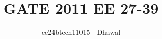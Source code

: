 \documentclass[journal]{IEEEtran}
\begin{document}

\vspace{3cm}


\title{GATE 2011 EE 27-39}
\author{ee24btech11015 - Dhawal}
\maketitle
{\let\newpage\relax\maketitle}

\renewcommand{\thefigure}{\theenumi}
\renewcommand{\thetable}{\theenumi}
\setlength{\intextsep}{10pt} %
\end{document}
